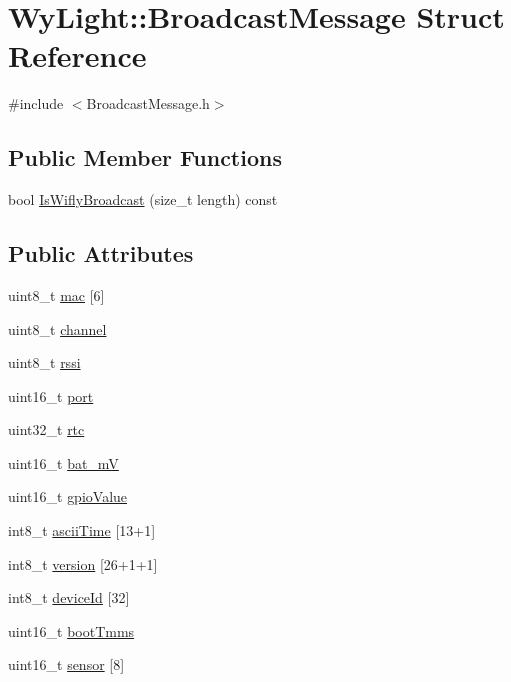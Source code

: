 \hypertarget{struct_wy_light_1_1_broadcast_message}{\section{Wy\-Light\-:\-:Broadcast\-Message Struct Reference}
\label{struct_wy_light_1_1_broadcast_message}
}


{\ttfamily \#include $<$Broadcast\-Message.\-h$>$}

\subsection*{Public Member Functions}
\begin{DoxyCompactItemize}
\item 
bool \hyperlink{struct_wy_light_1_1_broadcast_message_a1cddfb2dd5da9655d50d7918944d038b}{Is\-Wifly\-Broadcast} (size\-\_\-t length) const 
\end{DoxyCompactItemize}
\subsection*{Public Attributes}
\begin{DoxyCompactItemize}
\item 
uint8\-\_\-t \hyperlink{struct_wy_light_1_1_broadcast_message_a18f1e421ad5fa744476fdb6fe05592a9}{mac} \mbox{[}6\mbox{]}
\item 
uint8\-\_\-t \hyperlink{struct_wy_light_1_1_broadcast_message_a849c4547cb6f96e94e105bbbd2e17aa0}{channel}
\item 
uint8\-\_\-t \hyperlink{struct_wy_light_1_1_broadcast_message_a7284df9957e3fe4d8cc77d5fd64f6ad0}{rssi}
\item 
uint16\-\_\-t \hyperlink{struct_wy_light_1_1_broadcast_message_a876ea107ee7d7a92d8dc026544ab37ca}{port}
\item 
uint32\-\_\-t \hyperlink{struct_wy_light_1_1_broadcast_message_a4cc5a5b440dc793d0ca62b512fd0ca3c}{rtc}
\item 
uint16\-\_\-t \hyperlink{struct_wy_light_1_1_broadcast_message_aece2abbfade1888f969880e9d4cd2bfa}{bat\-\_\-m\-V}
\item 
uint16\-\_\-t \hyperlink{struct_wy_light_1_1_broadcast_message_a3317f27030e3f644bf4c3f29748d2aa0}{gpio\-Value}
\item 
int8\-\_\-t \hyperlink{struct_wy_light_1_1_broadcast_message_ae1c6e62089826e12d7cacdfc2b349a6a}{ascii\-Time} \mbox{[}13+1\mbox{]}
\item 
int8\-\_\-t \hyperlink{struct_wy_light_1_1_broadcast_message_a0a8793ce043e90aab098589663d2284c}{version} \mbox{[}26+1+1\mbox{]}
\item 
int8\-\_\-t \hyperlink{struct_wy_light_1_1_broadcast_message_ae80dfbcfe5dd61783560861f294e7e90}{device\-Id} \mbox{[}32\mbox{]}
\item 
uint16\-\_\-t \hyperlink{struct_wy_light_1_1_broadcast_message_a52b9e5a034569cf7592cd902c292d577}{boot\-Tmms}
\item 
uint16\-\_\-t \hyperlink{struct_wy_light_1_1_broadcast_message_ac999a8e5814f990c66a07b448d961095}{sensor} \mbox{[}8\mbox{]}
\end{DoxyCompactItemize}


